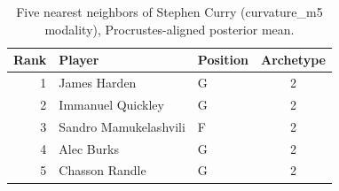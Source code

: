 \begin{table}[htbp]
  \centering\small
  \begin{tabular}{rllc}
    \toprule
    Rank & Player & Position & Archetype \\
    \midrule
    1 & James Harden & G & 2 \\
    2 & Immanuel Quickley & G & 2 \\
    3 & Sandro Mamukelashvili & F & 2 \\
    4 & Alec Burks & G & 2 \\
    5 & Chasson Randle & G & 2 \\
    \bottomrule
  \end{tabular}
  \caption{Five nearest neighbors of Stephen Curry (curvature_m5 modality), Procrustes-aligned posterior mean.}
  \label{tab:Stephen_Curry_neighbors_curvature_m5}
\end{table}

